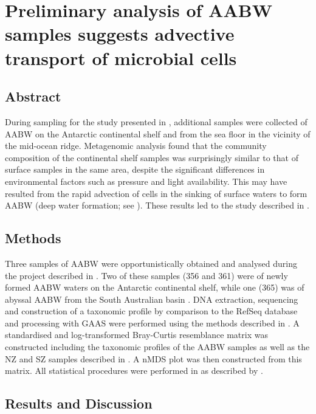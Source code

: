 \chapter[Deep water formation]{Preliminary analysis of \ac{AABW} samples suggests advective transport of microbial cells}
\label{ch:deepwaterformation}

\section{Abstract}

During sampling for the study presented in , additional samples were collected of \ac{AABW} on the Antarctic continental shelf and from the sea floor in the vicinity of the mid-ocean ridge.
Metagenomic analysis found that the community composition of the continental shelf samples was surprisingly similar to that of surface samples in the same area, despite the significant differences in environmental factors such as pressure and light availability.
This may have resulted from the rapid advection of cells in the sinking of surface waters to form \ac{AABW} (deep water formation; see ).
These results led to the study described in .

\section{Methods}


Three samples of \ac{AABW} were opportunistically obtained and analysed during the project described in  .
Two of these samples (356 and 361) were of newly formed \ac{AABW} waters on the Antarctic continental shelf, while one (365) was of abyssal \ac{AABW} from the South Australian basin .
DNA extraction, sequencing and construction of a taxonomic profile by  comparison to the RefSeq database and processing with \ac{GAAS} were performed using the methods described in .
A standardised and log-transformed Bray-Curtis resemblance matrix was constructed including the taxonomic profiles of the \ac{AABW} samples as well as the \ac{NZ} and \ac{SZ} samples described in .
A \ac{nMDS} plot was then constructed from this matrix.
All statistical procedures were performed in  as described by \citet{Clarke:2001ut}.

\section{Results and Discussion}

